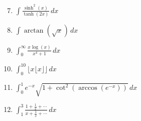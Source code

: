 \documentclass{article}
\begin{document}
\begin{enumerate}
    \setcounter{enumi}{6}
    \item \(\int \frac{\sinh^2(x)}{\tanh(2x)} \, dx\)
    
    \item \(\int \arctan(\sqrt{x}) \, dx\)
    
    \item \(\int_{0}^{\infty} \frac{x \log(x)}{x^4 + 1} \, dx\)
    
    \item \(\int_{0}^{10} \lfloor x \lfloor x \rfloor \rfloor \, dx\)
    
    \item \(\int_{0}^{1} e^{-x} \sqrt{1 + \cot^2(\arccos(e^{-x}))} \, dx\)
    
    \item \(\int_{1}^{3} \frac{1 + \frac{1}{x} + \cdots}{x + \frac{1}{x} + \cdots} \, dx\)
\end{enumerate}
\end{document}
